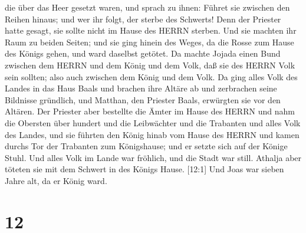 die über das Heer gesetzt waren, und sprach zu ihnen: Führet sie
zwischen den Reihen hinaus; und wer ihr folgt, der sterbe des Schwerts!
Denn der Priester hatte gesagt, sie sollte nicht im Hause des HERRN
sterben.  Und sie machten ihr Raum zu beiden Seiten; und
sie ging hinein des Weges, da die Rosse zum Hause des Königs gehen, und
ward daselbst getötet.  Da machte Jojada einen Bund
zwischen dem HERRN und dem König und dem Volk, daß sie des HERRN Volk
sein sollten; also auch zwischen dem König und dem Volk. 
Da ging alles Volk des Landes in das Haus Baals und brachen ihre Altäre
ab und zerbrachen seine Bildnisse gründlich, und Matthan, den Priester
Baals, erwürgten sie vor den Altären. Der Priester aber bestellte die
Ämter im Hause des HERRN  und nahm die Obersten über
hundert und die Leibwächter und die Trabanten und alles Volk des Landes,
und sie führten den König hinab vom Hause des HERRN und kamen durchs Tor
der Trabanten zum Königshause; und er setzte sich auf der Könige Stuhl.
 Und alles Volk im Lande war fröhlich, und die Stadt war
still. Athalja aber töteten sie mit dem Schwert in des Königs Hause.
 {[}12:1{]} Und Joas war sieben Jahre alt, da er König
ward.

\hypertarget{section-11}{%
\section{12}\label{section-11}}

